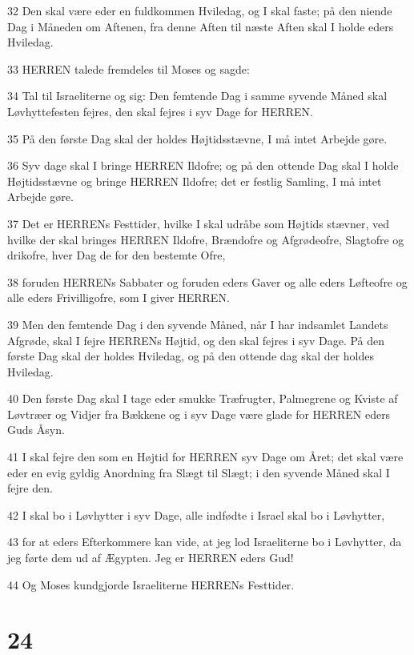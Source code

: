 \par 32 Den skal være eder en fuldkommen Hviledag, og I skal faste; på den niende Dag i Måneden om Aftenen, fra denne Aften til næste Aften skal I holde eders Hviledag.
\par 33 HERREN talede fremdeles til Moses og sagde:
\par 34 Tal til Israeliterne og sig: Den femtende Dag i samme syvende Måned skal Løvhyttefesten fejres, den skal fejres i syv Dage for HERREN.
\par 35 På den første Dag skal der holdes Højtidsstævne, I må intet Arbejde gøre.
\par 36 Syv dage skal I bringe HERREN Ildofre; og på den ottende Dag skal I holde Højtidsstævne og bringe HERREN Ildofre; det er festlig Samling, I må intet Arbejde gøre.
\par 37 Det er HERRENs Festtider, hvilke I skal udråbe som Højtids stævner, ved hvilke der skal bringes HERREN Ildofre, Brændofre og Afgrødeofre, Slagtofre og drikofre, hver Dag de for den bestemte Ofre,
\par 38 foruden HERRENs Sabbater og foruden eders Gaver og alle eders Løfteofre og alle eders Frivilligofre, som I giver HERREN.
\par 39 Men den femtende Dag i den syvende Måned, når I har indsamlet Landets Afgrøde, skal I fejre HERRENs Højtid, og den skal fejres i syv Dage. På den første Dag skal der holdes Hviledag, og på den ottende dag skal der holdes Hviledag.
\par 40 Den første Dag skal I tage eder smukke Træfrugter, Palmegrene og Kviste af Løvtræer og Vidjer fra Bækkene og i syv Dage være glade for HERREN eders Guds Åsyn.
\par 41 I skal fejre den som en Højtid for HERREN syv Dage om Året; det skal være eder en evig gyldig Anordning fra Slægt til Slægt; i den syvende Måned skal I fejre den.
\par 42 I skal bo i Løvhytter i syv Dage, alle indfødte i Israel skal bo i Løvhytter,
\par 43 for at eders Efterkommere kan vide, at jeg lod Israeliterne bo i Løvhytter, da jeg førte dem ud af Ægypten. Jeg er HERREN eders Gud!
\par 44 Og Moses kundgjorde Israeliterne HERRENs Festtider.

\chapter{24}

